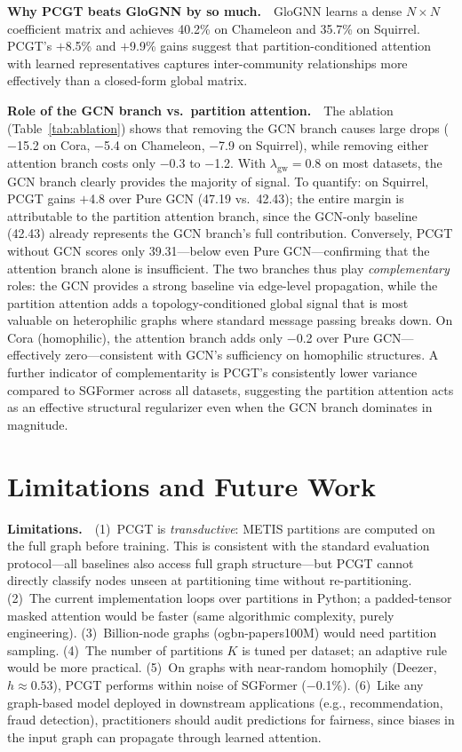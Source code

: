 \documentclass[manuscript, screen, review, anonymous]{acmart}
\begin{document}
\textbf{Why PCGT beats GloGNN by so much.}~~GloGNN learns a dense $N \times N$ coefficient matrix and achieves 40.2\% on Chameleon and 35.7\% on Squirrel. PCGT's $+$8.5\% and $+$9.9\% gains suggest that partition-conditioned attention with learned representatives captures inter-community relationships more effectively than a closed-form global matrix.

\textbf{Role of the GCN branch vs.\ partition attention.}~~The ablation (Table~\ref{tab:ablation}) shows that removing the GCN branch causes large drops ($-$15.2 on Cora, $-$5.4 on Chameleon, $-$7.9 on Squirrel), while removing either attention branch costs only $-$0.3 to $-$1.2. With $\lambda_{\text{gw}}=0.8$ on most datasets, the GCN branch clearly provides the majority of signal. To quantify: on Squirrel, PCGT gains $+$4.8 over Pure GCN (47.19 vs.\ 42.43); the entire margin is attributable to the partition attention branch, since the GCN-only baseline (42.43) already represents the GCN branch's full contribution. Conversely, PCGT without GCN scores only 39.31---below even Pure GCN---confirming that the attention branch alone is insufficient. The two branches thus play \emph{complementary} roles: the GCN provides a strong baseline via edge-level propagation, while the partition attention adds a topology-conditioned global signal that is most valuable on heterophilic graphs where standard message passing breaks down. On Cora (homophilic), the attention branch adds only $-$0.2 over Pure GCN---effectively zero---consistent with GCN's sufficiency on homophilic structures. A further indicator of complementarity is PCGT's consistently lower variance compared to SGFormer across all datasets, suggesting the partition attention acts as an effective structural regularizer even when the GCN branch dominates in magnitude.


\section{Limitations and Future Work}
\label{sec:limitations}

\textbf{Limitations.}~~(1)~PCGT is \emph{transductive}: METIS partitions are computed on the full graph before training. This is consistent with the standard evaluation protocol---all baselines also access full graph structure---but PCGT cannot directly classify nodes unseen at partitioning time without re-partitioning. (2)~The current implementation loops over partitions in Python; a padded-tensor masked attention would be faster (same algorithmic complexity, purely engineering). (3)~Billion-node graphs (ogbn-papers100M) would need partition sampling. (4)~The number of partitions $K$ is tuned per dataset; an adaptive rule would be more practical. (5)~On graphs with near-random homophily (Deezer, $h \approx 0.53$), PCGT performs within noise of SGFormer ($-$0.1\%). (6)~Like any graph-based model deployed in downstream applications (e.g., recommendation, fraud detection), practitioners should audit predictions for fairness, since biases in the input graph can propagate through learned attention.
\end{document}
